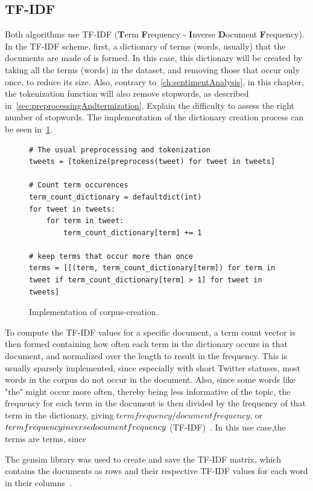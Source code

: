 \subsection{TF-IDF}
\label{subsec:tfidf}

Both algorithms use TF-IDF (\textbf{T}erm \textbf{F}requency - \textbf{I}nverse \textbf{D}ocument \textbf{F}requency).
In the TF-IDF scheme, first, a dictionary of terms (words, usually) that the documents are made of is formed.
In this case, this dictionary will be created by taking all the terms (words) in the dataset,
and removing those that occur only once, to reduce its size.
Also, contrary to~\ref{ch:sentimentAnalysis}, in this chapter,
the tokenization function will also remove stopwords, as described in~\ref{sec:preprocessingAndtermization}.
Explain the difficulty to assess the right number of stopwords.
The implementation of the dictionary creation process can be seen in~\ref{code:create_corpus}.

\begin{figure}
    \caption{Implementation of corpus-creation.}
    \label{code:create_corpus}
    \begin{verbatim}
# The usual preprocessing and tokenization
tweets = [tokenize(preprocess(tweet) for tweet in tweets]

# Count term occurences
term_count_dictionary = defaultdict(int)
for tweet in tweets:
    for term in tweet:
        term_count_dictionary[term] += 1

# keep terms that occur more than once
terms = [[(term, term_count_dictionary[term]) for term in tweet if term_count_dictionary[term] > 1] for tweet in tweets]
    \end{verbatim}
\end{figure}

\par
To compute the TF-IDF values for a specific document,
a term count vector is then formed containing how often each term in the dictionary occurs in that document,
and normalized over the length to result in the frequency.
This is usually sparsely implemented, since especially with short Twitter statuses,
most words in the corpus do not occur in the document.
Also, since some words like "the" might occur more often, thereby being less informative of the topic,
the frequency for each term in the document is then divided by the frequency of that term in the dictionary,
giving $term frequency / document frequency$, or $term frequency \* inverse document frequency$ (TF-IDF)~\cite{Blei2003}.
In this use case,the terms are terms, since
\par
The gensim library was used to create and save the TF-IDF matrix,
which contains the documents as rows and their respective TF-IDF values for each word in their columns~\cite{gensimDocs}.

